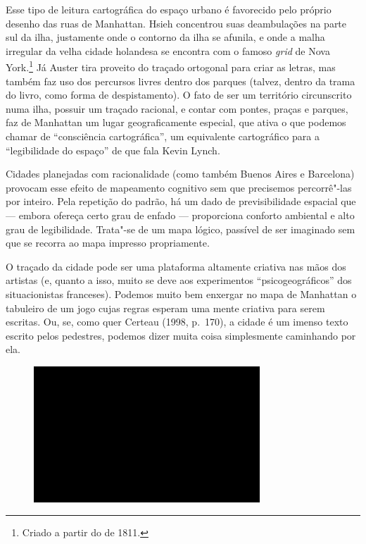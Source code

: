 Esse tipo de leitura cartográfica do espaço urbano é favorecido pelo
próprio desenho das ruas de Manhattan. Hsieh concentrou suas
deambulações na parte sul da ilha, justamente onde o contorno da ilha se
afunila, e onde a malha irregular da velha cidade holandesa se encontra
com o famoso \emph{grid} de Nova York.\footnote{Criado a partir do
  {} de 1811.} Já Auster tira proveito do
traçado ortogonal para criar as letras, mas também faz uso dos percursos
livres dentro dos parques (talvez, dentro da trama do livro, como forma
de despistamento). O fato de ser um território circunscrito numa ilha,
possuir um traçado racional, e contar com pontes, praças e parques, faz
de Manhattan um lugar geograficamente especial, que ativa o que podemos
chamar de ``consciência cartográfica'', um equivalente cartográfico para
a ``legibilidade do espaço'' de que fala Kevin Lynch.

Cidades planejadas com racionalidade (como também Buenos Aires e
Barcelona) provocam esse efeito de mapeamento cognitivo sem que
precisemos percorrê"-las por inteiro. Pela repetição do padrão, há um
dado de previsibilidade espacial que --- embora ofereça certo grau de
enfado --- proporciona conforto ambiental e alto grau de legibilidade.
Trata"-se de um mapa lógico, passível de ser imaginado sem que se recorra
ao mapa impresso propriamente.

O traçado da cidade pode ser uma plataforma altamente criativa nas mãos
dos artistas (e, quanto a isso, muito se deve aos experimentos
``psicogeográficos'' dos situacionistas franceses). Podemos muito bem
enxergar no mapa de Manhattan o tabuleiro de um jogo cujas regras
esperam uma mente criativa para serem escritas. Ou, se, como quer
Certeau (1998, p.~170), a cidade é um imenso texto escrito pelos
pedestres, podemos dizer muita coisa simplesmente caminhando por ela.

\begin{figure}[!ht]

\centering
 \includegraphics[width=85mm]{./imgs/im1.jpg}
\caption{\tiny{}}

\end{figure}


